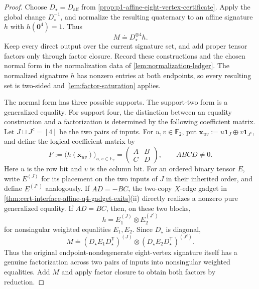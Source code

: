 \documentclass[11pt,letterpaper,onecolumn]{article}
\theoremstyle{plain}
\theoremstyle{definition}
\theoremstyle{remark}
\newcommand{\Ftwo}{\mathbb F_2}
\newcommand{\one}{\mathbf 1}
\newcommand{\zero}{\mathbf 0}
\begin{document}
\begin{proof}
Choose \(D_\star=D_{\mathrm{aff}}\) from
\cref{prop:p1-affine-eight-vertex-certificate}.  Apply the global change
\(D_\star^{-1}\), and normalize the resulting quaternary to an affine
signature \(h\) with \(h(\zero^4)=1\).  Thus
\[
 M\doteq D_\star^{\otimes4}h.
\]
Keep every direct output over the current signature set, and add proper
tensor factors only through factor closure.  Record these
constructions and the chosen normal form in the normalization data of
\cref{lem:normalization-ledger}. The normalized signature \(h\) has
nonzero entries at both endpoints, so every resulting set is two-sided and
\cref{lem:factor-saturation} applies.

The normal form has three possible supports. The support-two form is a
generalized equality. For support four, the distinction between an
equality construction and a factorization is determined by the following
coefficient matrix. Let \(J\sqcup J^c=[4]\) be the two pairs of inputs.  For \(u,v\in\Ftwo\), put
\({\mathbf x}_{uv}:=u\one_J\oplus v\one_{J^c}\), and define the logical coefficient matrix by
\[
 F:=\bigl(h({\mathbf x}_{uv})\bigr)_{u,v\in\Ftwo}
   =\begin{pmatrix}A&B\\ C&D\end{pmatrix},\qquad ABCD\ne0.
\]
Here \(u\) is the row bit and \(v\) is the column bit.
For an ordered binary tensor \(E\), write \(E^{(J)}\) for its placement on
the two inputs of \(J\) in their inherited order, and define
\(E^{(J^c)}\) analogously.
If \(AD=-BC\), the two-copy \(X\)-edge gadget in
\cref{thm:cert-interface-affine-q4-gadget-exits}\textnormal{(ii)} directly realizes a nonzero pure
generalized equality.  If \(AD=BC\), then, on these two blocks,
\[
  h=E_1^{(J)}\otimes E_2^{(J^c)}
\]
for nonsingular weighted equalities \(E_1,E_2\).  Since \(D_\star\) is
diagonal,
\[
  M\doteq
  (D_\star E_1D_\star^{\mathsf T})^{(J)}\otimes
  (D_\star E_2D_\star^{\mathsf T})^{(J^c)}.
\]
Thus the original endpoint-nondegenerate eight-vertex signature itself has a
genuine factorization across two pairs of inputs into nonsingular weighted
equalities.  Add \(M\) and apply factor closure to
obtain both factors by reduction.


\end{proof}
\end{document}
